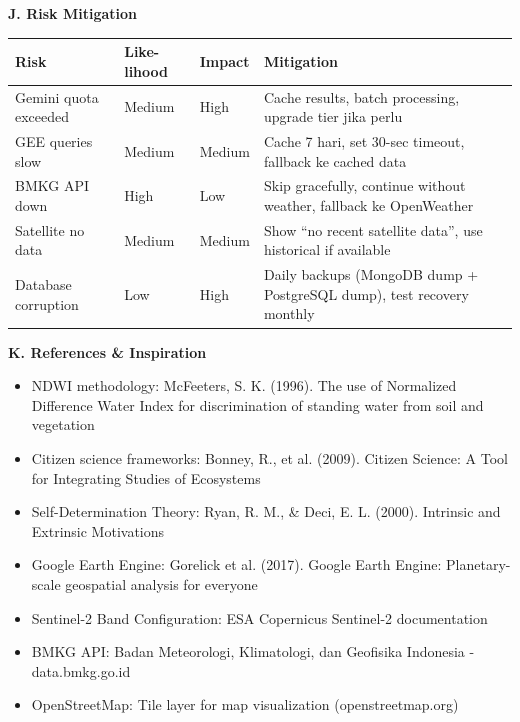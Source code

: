 \documentclass[12pt,a4paper]{article}
\newcommand{\subsectionbox}[1]{%
  \textbf{\large #1}\\[0.3cm]
}
\begin{document}
\vspace{0.5cm}

\subsectionbox{J. Risk Mitigation}

\begin{tabularx}{\textwidth}{|l|l|l|X|}
  \hline
  \textbf{Risk} & \textbf{Like-lihood} & \textbf{Impact} & \textbf{Mitigation} \\
  \hline
  Gemini quota exceeded & Medium & High & Cache results, batch processing, upgrade tier jika perlu \\
  GEE queries slow & Medium & Medium & Cache 7 hari, set 30-sec timeout, fallback ke cached data \\
  BMKG API down & High & Low & Skip gracefully, continue without weather, fallback ke OpenWeather \\
  Satellite no data & Medium & Medium & Show ``no recent satellite data'', use historical if available \\
  Database corruption & Low & High & Daily backups (MongoDB dump + PostgreSQL dump), test recovery monthly \\
  \hline
\end{tabularx}

\vspace{0.5cm}

\subsectionbox{K. References \& Inspiration}

\begin{itemize}
  \item NDWI methodology: McFeeters, S. K. (1996). The use of Normalized Difference Water Index for discrimination of standing water from soil and vegetation
  \item Citizen science frameworks: Bonney, R., et al. (2009). Citizen Science: A Tool for Integrating Studies of Ecosystems
  \item Self-Determination Theory: Ryan, R. M., \& Deci, E. L. (2000). Intrinsic and Extrinsic Motivations
  \item Google Earth Engine: Gorelick et al. (2017). Google Earth Engine: Planetary-scale geospatial analysis for everyone
  \item Sentinel-2 Band Configuration: ESA Copernicus Sentinel-2 documentation
  \item BMKG API: Badan Meteorologi, Klimatologi, dan Geofisika Indonesia - data.bmkg.go.id
  \item OpenStreetMap: Tile layer for map visualization (openstreetmap.org)
\end{itemize}

\vspace{1.5cm}
\end{document}
